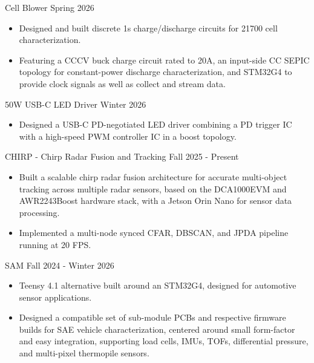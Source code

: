 \documentclass[9pt]{developercv} %
\begin{document}
\vspace{-15 pt}
\begin{entrylist}

    \entry
    {}
    {Cell Blower}
    {Spring 2026}
    {\vspace{-12pt}
    \begin{itemize}[noitemsep,topsep=0pt,parsep=0pt,partopsep=0pt, leftmargin=10pt]
    \item Designed and built discrete 1s charge/discharge circuits for 21700 cell characterization.
    \item Featuring a CCCV buck charge circuit rated to 20A, an input-side CC SEPIC topology for constant-power discharge characterization, and STM32G4 to provide clock signals as well as collect and stream data.
    \end{itemize}
    }


    \entry
    {}
    {50W USB-C LED Driver}
    {Winter 2026}
    {\vspace{-12pt}
    \begin{itemize}[noitemsep,topsep=0pt,parsep=0pt,partopsep=0pt, leftmargin=10pt]
    \item Designed a USB-C PD-negotiated LED driver combining a PD trigger IC with a high-speed PWM controller IC in a boost topology.
    \end{itemize}
    }

    \entry
    {}
    {CHIRP - Chirp Radar Fusion and Tracking }
    {Fall 2025 - Present}
    {\vspace{-12pt}
    \begin{itemize}[noitemsep,topsep=0pt,parsep=0pt,partopsep=0pt, leftmargin=10pt]
        \item Built a scalable chirp radar fusion architecture for accurate multi-object tracking across multiple radar sensors, based on the DCA1000EVM and AWR2243Boost hardware stack, with a Jetson Orin Nano for sensor data processing.
        \item Implemented a multi-node synced CFAR, DBSCAN, and JPDA pipeline running at 20 FPS.
    \end{itemize}
    }

    \entry
    {}
    {SAM}
    {Fall 2024 - Winter 2026}
    {\vspace{-12pt}
    \begin{itemize}[noitemsep,topsep=0pt,parsep=0pt,partopsep=0pt, leftmargin=10pt]
    \item Teensy 4.1 alternative built around an STM32G4, designed for automotive sensor applications.
    \item Designed a compatible set of sub-module PCBs and respective firmware builds for SAE vehicle characterization, centered around small form-factor and easy integration, supporting load cells, IMUs, TOFs, differential pressure, and multi-pixel thermopile sensors.
    \end{itemize}
    }


\end{entrylist}
\end{document}
